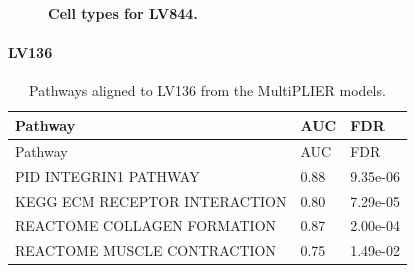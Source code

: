 \documentclass[
  a4paper,
]{article}
\newenvironment{fignos:tagged-figure}[1][]{
  \let\oldfigurename\figurename
  \renewcommand{\figurename}{Supplementary Figure}
}{
  \let\figurename\oldfigurename
}
\newenvironment{tablenos:tagged-table}[1][]{
  \let\oldtablename\tablename
  \renewcommand{\tablename}{Supplementary Table}
}{
  \let\tablename\oldtablename
}
\begin{document}
\begin{fignos:tagged-figure}[S22]

\begin{figure}
\hypertarget{fig:sup:lv844}{%
\centering

\caption{\textbf{Cell types for LV844.}}\label{fig:sup:lv844}
}
\end{figure}

\end{fignos:tagged-figure}

\clearpage

\hypertarget{lv136}{%
\paragraph{LV136}\label{lv136}}

\begin{tablenos:tagged-table}[S30]

\begin{longtable}[]{@{}lll@{}}
\caption{Pathways aligned to LV136 from the MultiPLIER models.
\label{tbl:sup:multiplier_pathways:lv136}}\label{tbl:sup:multiplier_pathways:lv136}\tabularnewline
\toprule()
Pathway & AUC & FDR \\
\midrule()
\endfirsthead
\toprule()
Pathway & AUC & FDR \\
\midrule()
\endhead
PID INTEGRIN1 PATHWAY & 0.88 & 9.35e-06 \\
KEGG ECM RECEPTOR INTERACTION & 0.80 & 7.29e-05 \\
REACTOME COLLAGEN FORMATION & 0.87 & 2.00e-04 \\
REACTOME MUSCLE CONTRACTION & 0.75 & 1.49e-02 \\
\bottomrule()
\end{longtable}

\end{tablenos:tagged-table}
\end{document}
